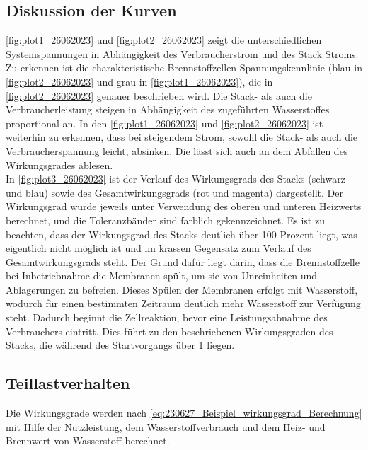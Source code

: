    \subsection{Diskussion der Kurven}
   \autoref{fig:plot1_26062023} und \autoref{fig:plot2_26062023} zeigt die unterschiedlichen Systemspannungen in Abhängigkeit des
Verbraucherstrom und des Stack Stroms. Zu erkennen ist die charakteristische Brennstoffzellen Spannungskennlinie
 (blau in \autoref{fig:plot2_26062023} und grau in  \autoref{fig:plot1_26062023}), die in \autoref{fig:plot2_26062023} genauer beschrieben wird. Die Stack- als auch die Verbraucherleistung
steigen in Abhängigkeit des zugeführten Wasserstoffes proportional an. In den \autoref{fig:plot1_26062023} 
und \autoref{fig:plot2_26062023} ist weiterhin zu erkennen, dass bei
 steigendem Strom, sowohl die Stack- als
auch die Verbraucherspannung leicht, absinken. Die lässt sich auch an dem Abfallen des
Wirkungsgrades ablesen.
\\ In \autoref{fig:plot3_26062023} ist der Verlauf des Wirkungsgrads des Stacks (schwarz und blau) sowie des Gesamtwirkungsgrads (rot und magenta) dargestellt. Der Wirkungsgrad wurde jeweils unter Verwendung des oberen und unteren Heizwerts berechnet, und die Toleranzbänder sind farblich gekennzeichnet. Es ist zu beachten, dass der Wirkungsgrad des Stacks deutlich über 100 Prozent liegt, was eigentlich nicht möglich ist und im krassen Gegensatz zum Verlauf des Gesamtwirkungsgrads steht.
Der Grund dafür liegt darin, dass die Brennstoffzelle bei Inbetriebnahme die Membranen spült, um sie von Unreinheiten und Ablagerungen zu befreien. Dieses Spülen der Membranen erfolgt mit Wasserstoff, wodurch für einen bestimmten Zeitraum deutlich mehr Wasserstoff zur Verfügung steht. Dadurch beginnt die Zellreaktion, bevor eine Leistungsabnahme des Verbrauchers eintritt. Dies führt zu den beschriebenen Wirkungsgraden des Stacks, die während des Startvorgangs über 1 liegen.
\\
\subsection{}
\subsection{Teillastverhalten}

Die Wirkungsgrade werden nach \autoref{eq:230627_Beispiel_wirkungsgrad_Berechnung} mit Hilfe der Nutzleistung, dem Wasserstoffverbrauch und dem Heiz- und Brennwert von Wasserstoff berechnet. 

